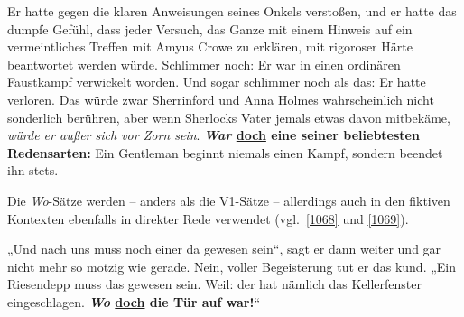 \begin{exe}
	\ex\label{1067} 

	Er hatte gegen die klaren Anweisungen seines Onkels verstoßen, und er hatte das dumpfe Gefühl, dass jeder Versuch, das Ganze mit einem Hinweis auf ein 		vermeintliches Treffen mit Amyus Crowe zu erklären, mit rigoroser Härte beantwortet werden würde. Schlimmer noch: Er war in einen ordinären Faustkampf 		verwickelt worden. Und sogar schlimmer noch als das: Er hatte verloren. Das würde zwar Sherrinford und Anna Holmes wahrscheinlich nicht sonderlich 			berühren, aber wenn Sherlocks Vater jemals etwas davon mitbekäme, \emph{würde er außer sich vor Zorn sein}. \textbf{\textit{War} \ul{doch} eine 		seiner beliebtesten Redensarten:} Ein Gentleman beginnt niemals einen Kampf, sondern beendet ihn stets. 	
	\hfill\hbox{\citet[220--221]{Lane2014}}
\end{exe}
Die \textit{Wo}-Sätze werden – anders als die V1-Sätze – allerdings auch in den fiktiven Kontexten ebenfalls in direkter Rede verwendet (vgl.\ \ref{1068} und \ref{1069}).

\begin{exe}
	\ex\label{1068} 

	„Und nach uns muss noch einer da gewesen sein“, sagt er dann weiter und gar nicht mehr so motzig wie gerade. Nein, voller Begeisterung tut 		er das kund. „Ein Riesendepp muss das gewesen sein. Weil: der hat nämlich das Kellerfenster eingeschlagen. \textbf{\textit{Wo} \ul{doch} 		die Tür auf war!}“ 	
	\hfill\hbox{\citet[68]{Falk2010}}
\end{exe}

